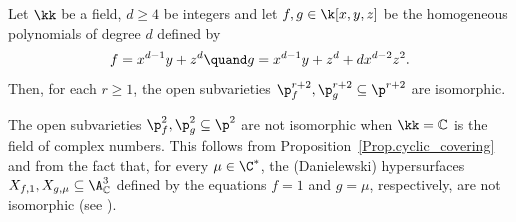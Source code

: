 \begin{proposition}\label{Prop.Counterexample.dim3}Let $\kk$ be a field, $d\ge 4$ be integers and let $f,g\in\k[x,y,z]$ be the homogeneous polynomials of degree $d$ defined by \[f=x^{d-1}y+z^{d} \quand g=x^{d-1}y+z^{d}+dx^{d-2}z^2.\] Then, for each $r\ge 1$, the
open subvarieties $\p^{r+2}_f,\p^{r+2}_g \subseteq \p^{r+2}$ are isomorphic.
\end{proposition}

\begin{remark}
The open subvarieties $\p^{2}_f,\p^{2}_g \subseteq \p^{2}$ are not isomorphic when $\kk=\mathbb{C}$ is the field of complex numbers. This follows from Proposition~\ref{Prop.cyclic_covering} and from the fact that, for every $\mu\in\C^*$, the (Danielewski) hypersurfaces $X_{f,1}, X_{g,\mu}\subseteq\A^3_{\mathbb{C}}$ defined by the equations $f=1$ and $g=\mu$, respectively, are not isomorphic (see \cite[Th.\,9]{PoloniClassifications}).
\end{remark}

